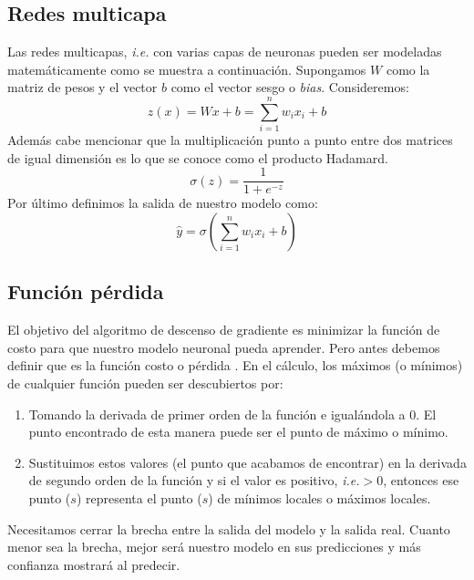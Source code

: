 \documentclass[a4paper,12pt]{article}
\begin{document}
\subsection{Redes multicapa}
Las redes multicapas, \textit{i.e.} con varias capas de neuronas pueden ser modeladas matemáticamente como se muestra a continuación.
Supongamos $W$ como la matriz de pesos y el vector $b$ como el vector sesgo o \textit{bias}.
Consideremos:
\begin{equation}
z(x)=Wx+b=\sum_{i=1}^{n}w_ix_i+b
\end{equation}
Además cabe mencionar que la multiplicación punto a punto entre dos matrices de igual dimensión es lo que se conoce como el producto Hadamard.
\begin{equation}
\sigma(z)=\frac{1}{1+e^{-z}}
\end{equation}
Por último definimos la salida de nuestro modelo como:
\begin{equation}
\hat{y}=\sigma(\sum_{i=1}^{n}w_ix_i+b)
\end{equation}

\subsection{Función pérdida}

El objetivo del algoritmo de descenso de gradiente es minimizar la función de costo para que nuestro modelo neuronal pueda aprender.
Pero antes debemos definir que es la función costo o pérdida \cite{sgd}.
En el cálculo, los máximos (o mínimos) de cualquier función pueden ser descubiertos por:
\begin{enumerate}
\item Tomando la derivada de primer orden de la función e igualándola a 0. El punto encontrado de esta manera puede ser el punto de máximo o mínimo.
\item Sustituimos estos valores (el punto que acabamos de encontrar) en la derivada de segundo orden de la función y si el valor es positivo, \textit{i.e.}$>0$, entonces ese punto ($s$) representa el punto ($s$) de mínimos locales o máximos locales.
\end{enumerate}

Necesitamos cerrar la brecha entre la salida del modelo y la salida real. Cuanto menor sea la brecha, mejor será nuestro modelo en sus predicciones y más confianza mostrará al predecir.
\end{document}
